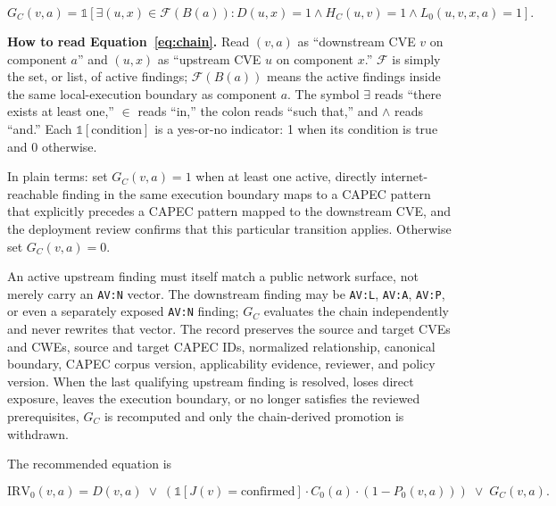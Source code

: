 \documentclass[11pt]{article}
\newcommand{\code}[1]{\texttt{#1}}
\newcommand{\ind}{\mathds{1}}
\begin{document}
\begin{equation}
G_C(v,a)=
\ind\!\left[
\exists (u,x)\in\mathcal F(B(a)):
D(u,x)=1\land H_C(u,v)=1\land L_0(u,v,x,a)=1
\right].
\label{eq:chain}
\end{equation}

\begin{plain}
\textbf{How to read Equation~\ref{eq:chain}.}
Read $(v,a)$ as ``downstream CVE $v$ on component $a$'' and $(u,x)$ as
``upstream CVE $u$ on component $x$.''
$\mathcal F$ is simply the set, or list, of active findings;
$\mathcal F(B(a))$ means the active findings inside the same local-execution
boundary as component $a$. The symbol $\exists$ reads ``there exists at least
one,'' $\in$ reads ``in,'' the colon reads ``such that,'' and $\land$ reads
``and.'' Each $\ind[\text{condition}]$ is a yes-or-no indicator: 1 when its
condition is true and 0 otherwise.

In plain terms: set $G_C(v,a)=1$ when at least one active, directly
internet-reachable finding in the same execution boundary maps to a CAPEC
pattern that explicitly precedes a CAPEC pattern mapped to the downstream CVE,
and the deployment review confirms that this particular transition applies.
Otherwise set $G_C(v,a)=0$.
\end{plain}

An active upstream finding must itself match a public network surface, not
merely carry an \code{AV:N} vector. The downstream finding may be
\code{AV:L}, \code{AV:A}, \code{AV:P}, or even a separately exposed
\code{AV:N} finding; $G_C$ evaluates the chain independently and never rewrites
that vector. The record preserves the source and target CVEs and CWEs, source
and target CAPEC IDs, normalized relationship, canonical boundary, CAPEC corpus
version, applicability evidence, reviewer, and policy version. When the last
qualifying upstream finding is resolved, loses direct exposure, leaves the
execution boundary, or no longer satisfies the reviewed prerequisites,
$G_C$ is recomputed and only the chain-derived promotion is withdrawn.

The recommended equation is

\begin{keybox}
\begin{equation}
\mathrm{IRV}_0(v,a)=
D(v,a)
\;\lor\;
\left(
\ind[J(v)=\mathrm{confirmed}]\cdot C_0(a)
\cdot\left(1-P_0(v,a)\right)
\right)
\;\lor\;
G_C(v,a).
\label{eq:operational}
\end{equation}
\end{keybox}
\end{document}
